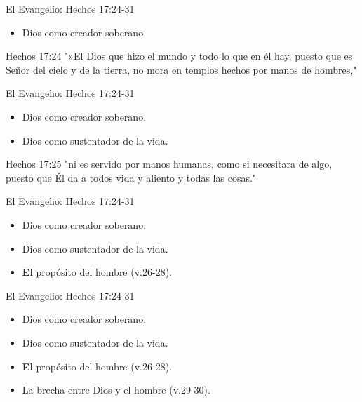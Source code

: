 \documentclass[17pt, aspectratio=169]{beamer}
\begin{document}
\begin{frame}{El Evangelio: Hechos 17:24-31}
    \begin{itemize}
        \item Dios como creador soberano.
    \end{itemize}
    
    \begin{citaBiblicaSlide}{Hechos 17:24}
        "»El Dios que hizo el mundo y todo lo que en él hay, puesto que es Señor del cielo y de la tierra, no mora en templos hechos por manos de hombres,"
    \end{citaBiblicaSlide}
\end{frame}

\begin{frame}{El Evangelio: Hechos 17:24-31}
    \begin{itemize}
        \item Dios como creador soberano.
        \item Dios como sustentador de la vida.
    \end{itemize}
    
    \begin{citaBiblicaSlide}{Hechos 17:25}
        "ni es servido por manos humanas, como si necesitara de algo, puesto que Él da a todos vida y aliento y todas las cosas."
    \end{citaBiblicaSlide}
\end{frame}

\begin{frame}{El Evangelio: Hechos 17:24-31}
    \begin{itemize}
        \item Dios como creador soberano.
        \item Dios como sustentador de la vida.
        \item \textbf{El} propósito del hombre (v.26-28).
    \end{itemize}
\end{frame}

\begin{frame}{El Evangelio: Hechos 17:24-31}
    \begin{itemize}
        \item Dios como creador soberano.
        \item Dios como sustentador de la vida.
        \item \textbf{El} propósito del hombre (v.26-28).
        \item La brecha entre Dios y el hombre (v.29-30).
    \end{itemize}
\end{frame}
\end{document}
